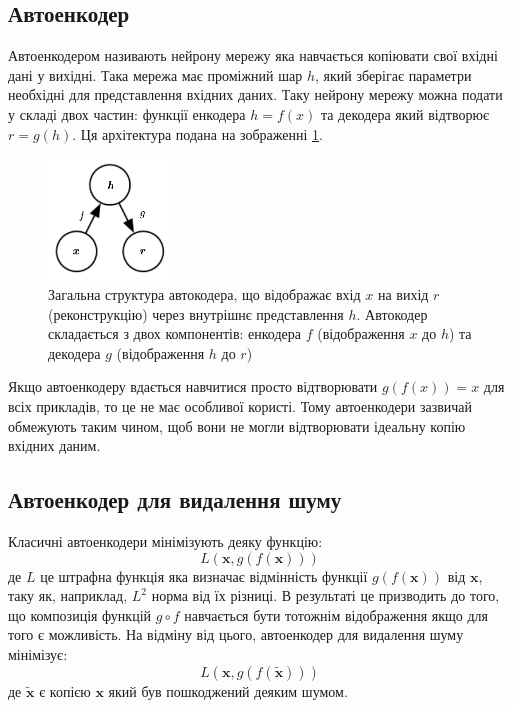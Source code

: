 \documentclass[14pt,a4paper]{extarticle}
\newcounter{e}
\numberwithin{equation}{section}
\numberwithin{figure}{section}
\begin{document}
	\subsection{Автоенкодер}
	
	Автоенкодером називають нейрону мережу яка навчається копіювати свої вхідні дані у вихідні. Така мережа має проміжний шар $h$, який зберігає параметри необхідні для представлення вхідних даних. Таку нейрону мережу можна подати у складі двох частин: функції енкодера $h = f(x)$ та декодера який відтворює $r = g(h)$. Ця архітектура подана на зображенні \ref*{fig:autoencoder-graph}.
	\begin{figure}[H]
		\centering
		\includegraphics[width=0.3\textwidth]{resources/autoencoder-graph.png}
		\caption{Загальна структура автокодера, що відображає вхід $x$ на вихід $r$ (реконструкцію) через внутрішнє представлення $h$. Автокодер складається з двох компонентів: енкодера $f$ (відображення $x$ до $h$) та декодера $g$ (відображення $h$ до $r$) \cite{Goodfellow-et-al-2016}} 
		\label{fig:autoencoder-graph}
	\end{figure}
	Якщо автоенкодеру вдається навчитися просто відтворювати $g(f(x)) = x$ для всіх прикладів, то це не має особливої користі. Тому автоенкодери зазвичай обмежують таким чином, щоб вони не могли відтворювати ідеальну копію вхідних даним. 
		
	\subsection{Автоенкодер для видалення шуму}
	Класичні автоенкодери мінімізують деяку функцію:
	\begin{equation}
		L(\boldsymbol{x}, g(f(\boldsymbol{x})))
	\end{equation}
	де $L$ це штрафна функція яка визначає відмінність функції $g(f(\boldsymbol{x}))$ від $\boldsymbol{x}$, таку як, наприклад,  $L^{2}$ норма від їх різниці. В результаті це призводить до того, що композиція функцій $g \circ f$ навчається бути тотожнім відображення якщо для того є можливість. На відміну від цього, автоенкодер для видалення шуму мінімізує:
	\begin{equation}
		L(\boldsymbol{x}, g(f(\tilde{\boldsymbol{x}})))
	\end{equation}
	де $\tilde{\boldsymbol{x}}$ є копією $\boldsymbol{x}$ який був пошкоджений деяким шумом. 
		
\end{document}
